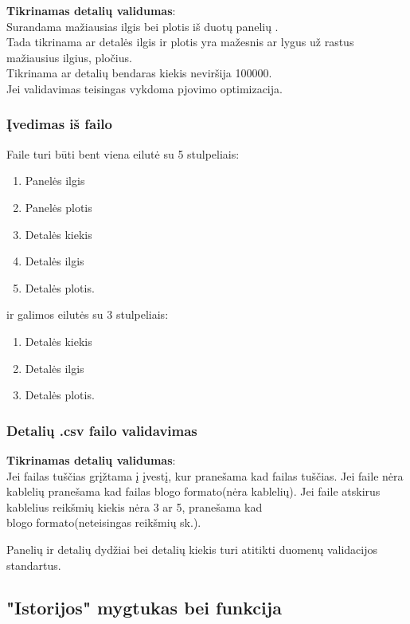 \documentclass[a4paper,12pt]{article}
\begin{document}
\textbf{Tikrinamas detalių validumas}:\\
	Surandama mažiausias ilgis bei plotis iš duotų panelių .\\
	Tada tikrinama ar detalės ilgis ir plotis yra mažesnis ar lygus už rastus mažiausius ilgius, pločius.\\
	Tikrinama ar detalių bendaras kiekis neviršija 100000. \\

Jei validavimas teisingas vykdoma pjovimo optimizacija.

\subsubsection{Įvedimas iš failo}

Faile turi būti bent viena eilutė su 5 stulpeliais:
\begin{enumerate}
	\item Panelės ilgis
	\item Panelės plotis
	\item Detalės kiekis
	\item Detalės ilgis
	\item Detalės plotis.
\end{enumerate}

ir galimos eilutės su 3 stulpeliais:
\begin{enumerate}
	\item Detalės kiekis
	\item Detalės ilgis
	\item Detalės plotis.
\end{enumerate}

\subsubsection{Detalių .csv failo validavimas}
\textbf{Tikrinamas detalių validumas}:\\
	Jei failas tuščias grįžtama į įvestį, kur pranešama kad failas tuščias.
	Jei faile nėra kablelių pranešama kad failas blogo formato(nėra kablelių).
	Jei faile atskirus kablelius reikšmių kiekis nėra 3 ar 5, pranešama kad \\
	blogo formato(neteisingas reikšmių sk.). 
		
	Panelių ir detalių dydžiai bei detalių kiekis turi atitikti duomenų validacijos standartus.\\


\subsection{"Istorijos" mygtukas bei funkcija}
\end{document}
